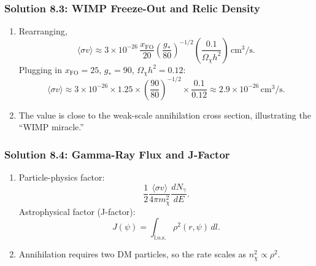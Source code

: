 \subsubsection*{Solution 8.3: WIMP Freeze-Out and Relic Density}

\begin{enumerate}[label=(\alph*)]
  \item Rearranging,
  \[
    \langle\sigma v\rangle \approx 3\times10^{-26}\,\frac{x_{\mathrm{FO}}}{20}
    \left(\frac{g_*}{80}\right)^{-1/2}\left(\frac{0.1}{\Omega_\chi h^2}\right)\,\mathrm{cm^3/s}.
  \]
  Plugging in $x_{\mathrm{FO}}=25$, $g_*=90$, $\Omega_\chi h^2=0.12$:
  \[
    \langle\sigma v\rangle \approx 3\times10^{-26}\times 1.25\times\left(\frac{90}{80}\right)^{-1/2}\times\frac{0.1}{0.12}
    \approx 2.9\times10^{-26}\,\mathrm{cm^3/s}.
  \]

  \item The value is close to the weak-scale annihilation cross section, illustrating the
  ``WIMP miracle.''
\end{enumerate}

\subsubsection*{Solution 8.4: Gamma-Ray Flux and J-Factor}

\begin{enumerate}[label=(\alph*)]
  \item Particle-physics factor:
  \[
    \frac{1}{2}\frac{\langle\sigma v\rangle}{4\pi m_\chi^2}\frac{dN_\gamma}{dE}.
  \]
  Astrophysical factor (J-factor):
  \[
    J(\psi)=\int_{\text{l.o.s.}}\rho^2(r,\psi)\,dl.
  \]

  \item Annihilation requires two DM particles, so the rate scales as
  $n_\chi^2\propto \rho^2$.
\end{enumerate}
